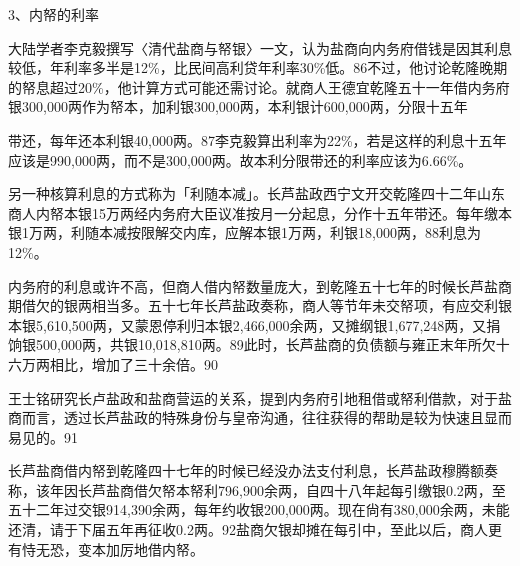 3、内帑的利率

大陆学者李克毅撰写〈清代盐商与帑银〉一文，认为盐商向内务府借钱是因其利息较低，年利率多半是12\%，比民间高利贷年利率30\%低。86不过，他讨论乾隆晚期的帑息超过20\%，他计算方式可能还需讨论。就商人王德宜乾隆五十一年借内务府银300,000两作为帑本，加利银300,000两，本利银计600,000两，分限十五年

\vfill
\begin{BookNotes}
\end{BookNotes}

\noindent 带还，每年还本利银40,000两。87李克毅算出利率为22\%，若是这样的利息十五年应该是990,000两，而不是300,000两。故本利分限带还的利率应该为6.66\%。

另一种核算利息的方式称为「利随本减」。长芦盐政西宁文开交乾隆四十二年山东商人内帑本银15万两经内务府大臣议准按月一分起息，分作十五年带还。每年缴本银1万两，利随本减按限解交内库，应解本银1万两，利银18,000两，88利息为12\%。

内务府的利息或许不高，但商人借内帑数量庞大，到乾隆五十七年的时候长芦盐商期借欠的银两相当多。五十七年长芦盐政奏称，商人等节年未交帑项，有应交利银本银5,610,500两，又蒙恩停利归本银2,466,000余两，又摊纲银1,677,248两，又捐饷银500,000两，共银10,018,810两。89此时，长芦盐商的负债额与雍正末年所欠十六万两相比，增加了三十余倍。90

王士铭研究长卢盐政和盐商营运的关系，提到内务府引地租借或帑利借款，对于盐商而言，透过长芦盐政的特殊身份与皇帝沟通，往往获得的帮助是较为快速且显而易见的。91

长芦盐商借内帑到乾隆四十七年的时候已经没办法支付利息，长芦盐政穆腾额奏称，该年因长芦盐商借欠帑本帑利796,900余两，自四十八年起每引缴银0.2两，至五十二年过交银914,390余两，每年约收银200,000两。现在尙有380,000余两，未能还清，请于下届五年再征收0.2两。92盐商欠银却摊在每引中，至此以后，商人更有恃无恐，变本加厉地借内帑。

\vfill
\begin{BookNotes}
\end{BookNotes}

